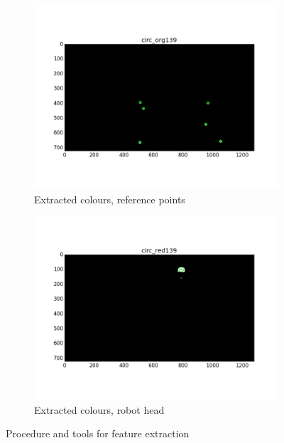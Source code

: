 \begin{figure}[H]
\begin{subfigure}[b]{0.49\linewidth}
		\includegraphics[width=\linewidth]{files/_circ_org139.png}
		\caption{Extracted colours, reference points}
		\label{fig:circ_org}
	\end{subfigure}
	\begin{subfigure}[b]{0.49\linewidth}
        \centering
		\includegraphics[width=\linewidth]{files/_circ_red139.png}
		\caption{Extracted colours, robot head}
		\label{fig:circ_red}
	\end{subfigure}
	\caption{Procedure and tools for feature extraction} 
\end{figure}



